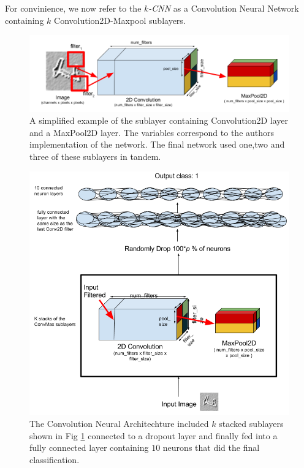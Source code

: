 \documentclass[conference]{IEEEtran}
\begin{document}
For convinience, we now refer to the \emph{$k$-CNN} as a Convolution Neural Network containing $k$ Convolution2D-Maxpool sublayers.

\begin{figure}[h]
	\includegraphics[scale=0.30]{convnet_example.png}
	\caption{A simplified example of the sublayer containing Convolution2D layer and a MaxPool2D layer. The variables correspond to the authors implementation of the network. The final network used one,two and three of these sublayers in tandem.}
	\label{convmaxlayer}
\end{figure}


\begin{figure}[h]
	\includegraphics[scale=0.30]{architecture.png}
	\caption{The Convolution Neural Architechture included $k$ stacked sublayers shown in Fig \ref{convmaxlayer} connected to a dropout layer and finally fed into a fully connected layer containing $10$ neurons that did the final classification.}
	\label{CNNarch}
\end{figure}
\end{document}
